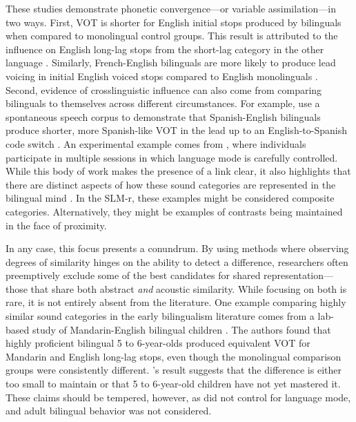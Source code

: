 These studies demonstrate phonetic convergence---or variable assimilation---in two ways. First, VOT is shorter for English initial stops produced by bilinguals when compared to monolingual control groups. This result is attributed to the influence on English long-lag stops from the short-lag category in the other language \citep{olson_2016_transfer, johnson_2021_language}. Similarly, French-English bilinguals are more likely to produce lead voicing in initial English voiced stops compared to English monolinguals \citep{sundara_2006_production}. Second, evidence of crosslinguistic influence can also come from comparing bilinguals to themselves across different circumstances. For example, \citet{fricke_2016_phonetic} use a spontaneous speech corpus to demonstrate that Spanish-English bilinguals produce shorter, more Spanish-like VOT in the lead up to an English-to-Spanish code switch \citep{fricke_2016_phonetic}. An experimental example comes from \citet{simonet_2019_convergence}, where individuals participate in multiple sessions in which language mode is carefully controlled. While this body of work makes the presence of a link clear, it also highlights that there are distinct aspects of how these sound categories are represented in the bilingual mind \citep{casillas_2021_interlingual}. In the SLM-r, these examples might be considered composite categories. Alternatively, they might be examples of contrasts being maintained in the face of proximity.

In any case, this focus presents a conundrum. By using methods where observing degrees of similarity hinges on the ability to detect a difference, researchers often preemptively exclude some of the best candidates for shared representation---those that share both abstract \textit{and} acoustic similarity. While focusing on both is rare, it is not entirely absent from the literature. One example comparing highly similar sound categories in the early bilingualism literature comes from a lab-based study of Mandarin-English bilingual children \citep{yang_2019_vot}. The authors found that highly proficient bilingual 5 to 6-year-olds produced equivalent VOT for Mandarin and English long-lag stops, even though the monolingual comparison groups were consistently different. \citeauthor{yang_2019_vot}'s result suggests that the difference is either too small to maintain or that 5 to 6-year-old children have not yet mastered it. These claims should be tempered, however, as \citet{yang_2019_vot} did not control for language mode, and adult bilingual behavior was not considered. 

